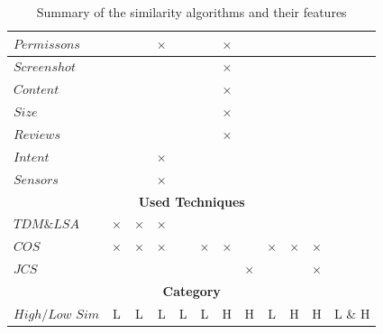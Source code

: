 \begin{landscape}
\begin{table}[htbp]
\begin{tabular}{|p{2.5cm}|c|c|c|c|c|c|c|c|c|c|c|}
			$Permissons$ &  &  & $\times$ &  &  & $\times$ &  &  &  &  &  \\\hline
			$Screenshot$ &  &  &  &  &  & $\times$ &  &  &  &   & \\\hline
			$Content$ &  &  &  &  &  & $\times$ &  &  &  &  & \\\hline
			$Size$ &  &  &  &  &  & $\times$ &  &  &  &   & \\\hline
			$Reviews$ &  &  &  &  &  & $\times$ &  &  &  & & \\\hline
			$Intent$ &  &  & $\times$ &  &  &  &  &   &   & & \\\hline
			$Sensors$ &  &  & $\times$ &  &  &  &  &  &   & & \\\hline
			
			\multicolumn{12}{|c|}{\bf Used Techniques} \\ \cline{1-12}
			$TDM \& LSA$ & $\times$ & $\times$ & $\times$ &  &  &  &  &  &   &  & \\\hline
			$COS$ & $\times$ & $\times$ & $\times$ &  & $\times$ & $\times$ &  & $\times$  &  $\times$ & $\times$  & \\\hline
			$JCS$ &  &  &  &  &  &  & $\times$ &  &  & $\times$ & \\\hline
			
			\multicolumn{12}{|c|}{\bf Category}  \\ \cline{1-12}
			$High/Low$ $Sim$ & L & L & L & L & L & H & H & L & H  & H  & L \& H \\\hline
			
		\end{tabular}
		\caption{Summary of the similarity algorithms and their features}
		\label{tbl:AlgorithmsAndFeatures}
	\end{table}	
\end{landscape}


